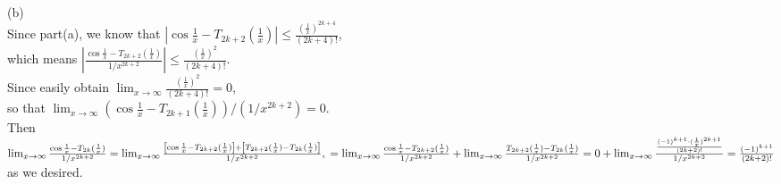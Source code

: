 \documentclass[12pt,reqno]{amsart}
\begin{document}
\\(b)\\
Since part(a), we know that
$\left|\cos \frac{1}{x}-T_{2 k+2}(\frac{1}{x})\right| \leq \frac{(\frac{1}{x})^{2 k+4}}{(2 k+4) !} $,
\\which means $\left|\frac{\cos \frac{1}{x}-T_{2 k+2}(\frac{1}{x})}{1 / x^{2 k+2}}\right|\leq \frac{(\frac{1}{x})^2}{(2 k+4) !}.$\\
Since easily obtain $\lim _{x \rightarrow \infty} \frac{(\frac{1}{x})^2}{(2 k+4) !}=0$, \\so that $\lim _{x \rightarrow \infty}(\cos \frac{1}{x}-T_{2 k+1}(\frac{1}{x})) /(1 / x^{2 k+2})=0$.\\
Then $\lim _{x \rightarrow \infty} \frac{\cos \frac{1}{x}-T_{2 k}(\frac{1}{x})}{1 / x^{2 k+2}}=\lim _{x \rightarrow \infty} \frac{\left[\cos \frac{1}{x}-T_{2 k+2}(\frac{1}{x})\right]+\left[T_{2 k+2}(\frac{1}{x})-T_{2 k}(\frac{1}{x})\right]}{1 / x^{2 k+2}}, \\
=\lim _{x \rightarrow \infty} \frac{\cos \frac{1}{x}-T_{2 k+2}(\frac{1}{x})}{1 / x^{2 k+2}}+\lim _{x \rightarrow \infty} \frac{T_{2 k+2}(\frac{1}{x})-T_{2 k}(\frac{1}{x})}{1 / x^{2 k+2}}=0+\lim _{x \rightarrow \infty} \frac{\frac{(-1)^{k+1} \cdot(\frac{1}{x})^{2 k+1}}{(2 k+2) !}}{1 / x^{2 k+2}}=\frac{(-1)^{k+1}}{(2 k+2) !}$ as we desired.
\end{document}
